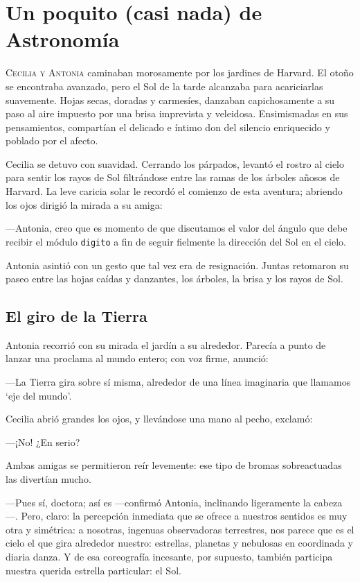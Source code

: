 \chapter{Un poquito (casi nada) de Astronomía}
\label{cap:poquito-de-astronomia}

\vfill

\lettrine[lines=2]{C}{ecilia y Antonia} caminaban morosamente por los
jardines de Harvard. El otoño se encontraba avanzado, pero el Sol de
la tarde alcanzaba para acariciarlas suavemente. Hojas secas, doradas
y carmesíes, danzaban capichosamente a su paso al aire impuesto por
una brisa imprevista y veleidosa. Ensimismadas en sus pensamientos,
compartían el delicado e íntimo don del silencio enriquecido y poblado
por el afecto.

Cecilia se detuvo con suavidad. Cerrando los párpados, levantó el
rostro al cielo para sentir los rayos de Sol filtrándose entre las
ramas de los árboles añosos de Harvard. La leve caricia solar le
recordó el comienzo de esta aventura; abriendo los ojos dirigió la
mirada a su amiga:

---Antonia, creo que es momento de que discutamos el valor del ángulo
que debe recibir el módulo \lstinline!digito! a fin de seguir
fiel\-men\-te la dirección del Sol en el cielo.

Antonia asintió con un gesto que tal vez era de resignación. Juntas
retomaron su paseo entre las hojas caídas y danzantes, los árboles, la
brisa y los rayos de Sol.


\section{El giro de la Tierra}

Antonia recorrió con su mirada el jardín a su alrededor. Parecía a
punto de lanzar una proclama al mundo entero; con voz firme, anunció:

---La Tierra gira sobre sí misma, alrededor de una línea imaginaria
que llamamos `eje del mundo'.

Cecilia abrió grandes los ojos, y llevándose una mano al pecho,
exclamó:

---¡No! ¿En serio?

Ambas amigas se permitieron reír levemente: ese tipo de bromas
sobreactuadas las divertían mucho.

---Pues sí, doctora; así es ---confirmó Antonia, inclinando
ligeramente la cabeza---. Pero, claro: la percepción inmediata que se
ofrece a nuestros sentidos es muy otra y simétrica: a nosotras,
ingenuas observadoras terrestres, nos parece que es el cielo el que
gira alrededor nuestro: estrellas, planetas y nebulosas en coordinada
y diaria danza. Y de esa coreografía incesante, por supuesto, también
participa nuestra querida estrella particular: el Sol.

